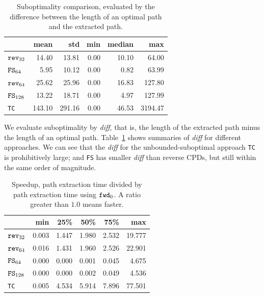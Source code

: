 \begin{table}[bt]
    \centering
    \begin{tabular}{lrrrrr}
    \toprule
    {}               &    mean &     std &   min &median &     max \\
    \midrule
    ${\tt rev}_{32}$       &   14.40 &   13.81 &  0.00 & 10.10 &   64.00 \\
    ${\tt FS}_{64}$        &    5.95 &   10.12 &  0.00 &  0.82 &   63.99 \\ \hline
    ${\tt rev}_{64}$       &   25.62 &   25.96 &  0.00 & 16.83 &  127.80 \\
    ${\tt FS}_{128}$       &   13.22 &   18.71 &  0.00 &  4.97 &  127.99 \\ \hline
    {\tt TC}               &  143.10 &  291.16 &  0.00 & 46.53 & 3194.47 \\
    \bottomrule
    \end{tabular}
    \caption{
    \small
    Suboptimality comparison, 
    evaluated by the difference between 
    the length of an optimal path and the extracted path.}
    \label{tab:diff}
\end{table}

We evaluate suboptimality by \textit{diff}, that is, 
the length of the extracted path minus 
the length of an optimal path.
Table~\ref{tab:diff} shows summaries of \textit{diff} for different approaches.
We can see that the \textit{diff} for the unbounded-suboptimal approach {\tt TC} 
is prohibitively large; 
and {\tt FS} has smaller \textit{diff} than reverse CPDs, 
but still within the same order of magnitude.

\begin{table}[tb]
    \centering
    \begin{tabular}{lrrrrr}
    \toprule
    {}                &   min &    25\% &    50\% &    75\% &  max \\
    \midrule
     ${\tt rev}_{32}$ & 0.003 &  1.447 &  1.980 &  2.532 &  19.777 \\
     ${\tt rev}_{64}$ & 0.016 &  1.431 &  1.960 &  2.526 &  22.901 \\
      ${\tt FS}_{64}$ & 0.000 &  0.000 &  0.001 &  0.045 &   4.675 \\
     ${\tt FS}_{128}$ & 0.000 &  0.000 &  0.002 &  0.049 &   4.536 \\
             {\tt TC} & 0.005 &  4.534 &  5.914 &  7.896 &  77.501 \\
    \bottomrule
    \end{tabular}
    \caption{
    Speedup, path extraction time divided by path  extraction time using ${\tt fwd}_0$. A ratio
    greater than $1.0$ means faster.}
    \label{tab:speed}
\end{table}

